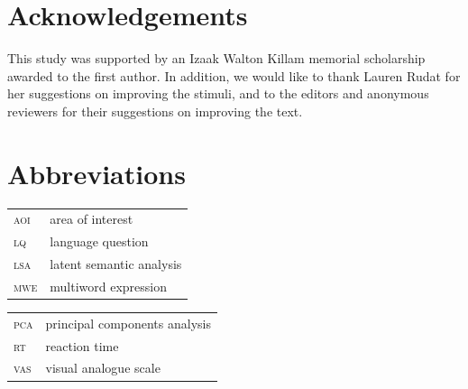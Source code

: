 \documentclass[output=paper,modfonts,nonflat]{langsci/langscibook}
\begin{document}





\section*{Acknowledgements}

This study was supported by an Izaak Walton Killam memorial scholarship awarded to the first author. In addition, we would like to thank Lauren Rudat for her suggestions on improving the stimuli, and to the editors and anonymous reviewers for their suggestions on improving the text.

\newpage
\section*{Abbreviations}



\begin{tabularx}{.48\textwidth}{ll}
\textsc{aoi} & area of interest  \\
\textsc{lq} & language question   \\
\textsc{lsa} & latent semantic analysis  \\
\textsc{mwe} & multiword expression \\
\end{tabularx}
\begin{tabularx}{.48\textwidth}{ll}
\textsc{pca} & principal components analysis  \\
\textsc{rt} & reaction time   \\
\textsc{vas} & visual analogue scale   \\
\end{tabularx}
\end{document}
